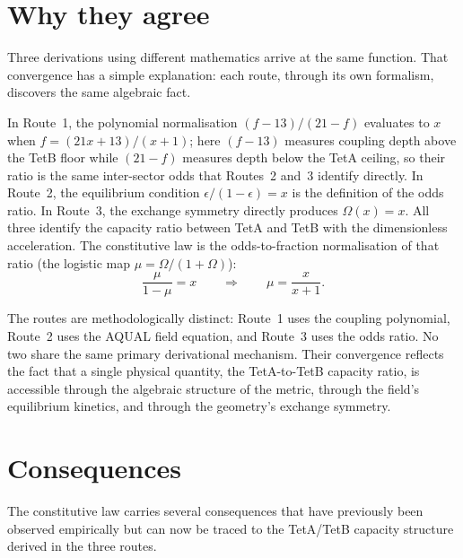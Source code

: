 \documentclass[twocolumn]{iopjournal}
\begin{document}

\section{Why they agree}

Three derivations using different mathematics arrive at the
same function. That convergence has a simple explanation: each
route, through its own formalism, discovers the same algebraic
fact.

In Route~1, the polynomial normalisation $(f - 13)/(21 - f)$
evaluates to $x$ when $f = (21x + 13)/(x+1)$; here $(f - 13)$
measures coupling depth above the TetB floor while $(21 - f)$
measures depth below the TetA ceiling, so their ratio is the
same inter-sector odds that Routes~2 and~3 identify directly.
In Route~2,
the equilibrium condition $\epsilon/(1-\epsilon) = x$ is the
definition of the odds ratio. In Route~3, the exchange symmetry
directly produces $\Omega(x) = x$. All three identify the
capacity ratio between TetA and TetB with the dimensionless
acceleration. The constitutive law is the odds-to-fraction
normalisation of that ratio (the logistic map
$\mu = \Omega/(1+\Omega)$):
\begin{equation}
  \frac{\mu}{1 - \mu} = x
  \qquad \Longrightarrow \qquad
  \mu = \frac{x}{x + 1}.
  \label{eq:convergence}
\end{equation}

The routes are methodologically distinct: Route~1 uses the coupling
polynomial, Route~2 uses the AQUAL field equation, and Route~3
uses the odds ratio. No two share the same primary derivational
mechanism. Their convergence
reflects the fact that a single physical quantity, the
TetA-to-TetB capacity ratio, is accessible through the
algebraic structure of the metric, through the field's
equilibrium kinetics, and through the geometry's exchange
symmetry.


\section{Consequences}
\label{sec:consequences}

The constitutive law carries several consequences that have
previously been observed empirically but can now be traced to
the TetA/TetB capacity structure derived in the three routes.
\end{document}
